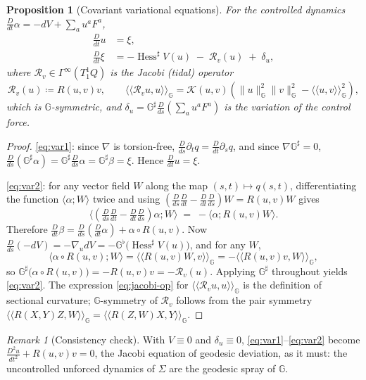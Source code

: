 \documentclass[11pt,a4paper]{article}
\newcommand{\Gm}{\mathbb{G}}                      %
\newcommand{\ipG}[2]{\langle\!\langle #1 , #2 \rangle\!\rangle_{\Gm}}
\newcommand{\dpair}[2]{\langle #1 ; #2 \rangle}   %
\newcommand{\Gsharp}{\Gm^{\sharp}}
\newcommand{\Gflat}{\Gm^{\flat}}
\newcommand{\Hess}{\operatorname{Hess}}
\newcommand{\Sect}{\mathcal{K}}
\newcommand{\Jac}{\mathcal{R}}
\newcommand{\Gsec}[1]{\Gamma^{\infty}(#1)}
\newcommand{\normG}[1]{\lVert #1 \rVert_{\Gm}}
\newcommand{\Dt}{\tfrac{D}{dt}}
\theoremstyle{plain}
\newtheorem{proposition}[theorem]{Proposition}
\theoremstyle{definition}
\theoremstyle{remark}
\newtheorem{remark}[theorem]{Remark}
\begin{document}
\begin{proposition}[Covariant variational equations]
\label{prop:variational}
For the controlled dynamics $\Dt\alpha = -dV + \sum_a u^aF^a$,
\begin{align}
  \Dt u &= \xi, \label{eq:var1}\\
  \Dt \xi &= -\Hess^{\sharp}V(u) \;-\; \Jac_v(u) \;+\; \delta_u,
    \label{eq:var2}
\end{align}
where $\Jac_v \in \Gsec{T^1_1Q}$ is the \emph{Jacobi} (tidal) operator
\begin{equation}
  \Jac_v(u) \coloneqq R(u,v)v ,
  \qquad
  \ipG{\Jac_v u}{u} = \Sect(u,v)\left(\normG{u}^2\normG{v}^2 - \ipG{u}{v}^2\right),
  \label{eq:jacobi-op}
\end{equation}
which is $\Gm$-symmetric, and
$\delta_u = \Gsharp\tfrac{D}{ds}\!\left(\sum_a u^aF^a\right)$ is the variation of
the control force.
\end{proposition}

\begin{proof}
\eqref{eq:var1}: since $\nabla$ is torsion-free,
$\tfrac{D}{ds}\partial_t q = \tfrac{D}{dt}\partial_s q$, and since
$\nabla\Gsharp = 0$,
$\tfrac{D}{ds}(\Gsharp\alpha) = \Gsharp\tfrac{D}{ds}\alpha = \Gsharp\beta = \xi$.
Hence $\Dt u = \xi$.

\eqref{eq:var2}: for any vector field $W$ along the map $(s,t)\mapsto q(s,t)$,
differentiating the function $\dpair{\alpha}{W}$ twice and using
$(\tfrac{D}{ds}\tfrac{D}{dt} - \tfrac{D}{dt}\tfrac{D}{ds})W = R(u,v)W$ gives
\[
  \dpair{\left(\tfrac{D}{ds}\tfrac{D}{dt} - \tfrac{D}{dt}\tfrac{D}{ds}\right)\alpha}{W}
  \;=\; -\dpair{\alpha}{R(u,v)W}.
\]
Therefore
$\Dt\beta = \tfrac{D}{ds}\!\left(\Dt\alpha\right) + \alpha\circ R(u,v)$.
Now $\tfrac{D}{ds}(-dV) = -\nabla_u dV = -\Gflat\big(\Hess^{\sharp}V(u)\big)$, and
for any $W$,
\[
  \dpair{\alpha\circ R(u,v)}{W} = \ipG{R(u,v)W}{v} = -\ipG{R(u,v)v}{W},
\]
so $\Gsharp\big(\alpha\circ R(u,v)\big) = -R(u,v)v = -\Jac_v(u)$. Applying
$\Gsharp$ throughout yields \eqref{eq:var2}. The expression \eqref{eq:jacobi-op}
for $\ipG{\Jac_vu}{u}$ is the definition of sectional curvature; $\Gm$-symmetry of
$\Jac_v$ follows from the pair symmetry $\ipG{R(X,Y)Z}{W} = \ipG{R(Z,W)X}{Y}$.
\end{proof}

\begin{remark}[Consistency check]
With $V \equiv 0$ and $\delta_u \equiv 0$, \eqref{eq:var1}--\eqref{eq:var2} become
$\tfrac{D^2u}{dt^2} + R(u,v)v = 0$, the Jacobi equation of geodesic deviation, as
it must: the uncontrolled unforced dynamics of $\Sigma$ are the geodesic spray of
$\Gm$.
\end{remark}
\end{document}
